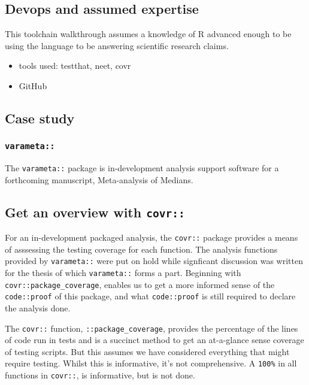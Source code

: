 \documentclass[
]{article}
\providecommand{\tightlist}{%
  \setlength{\itemsep}{0pt}\setlength{\parskip}{0pt}}
\begin{document}
\hypertarget{devops-and-assumed-expertise}{%
\subsection{Devops and assumed
expertise}\label{devops-and-assumed-expertise}}

This toolchain walkthrough assumes a knowledge of R advanced enough to
be using the language to be answering scientific research claims.

\begin{itemize}
\tightlist
\item
  tools used: testthat, neet, covr
\item
  GitHub
\end{itemize}

\hypertarget{case-study}{%
\subsection{Case study}\label{case-study}}

\hypertarget{varameta}{%
\subsubsection{\texorpdfstring{\texttt{varameta::}}{varameta::}}\label{varameta}}

The \texttt{varameta::} package is in-development analysis support
software for a forthcoming manuscript, Meta-analysis of Medians.

\hypertarget{get-an-overview-with-covr}{%
\subsection{\texorpdfstring{Get an overview with
\texttt{covr::}\label{sec: covr}}{Get an overview with covr::}}\label{get-an-overview-with-covr}}

For an in-development packaged analysis, the \texttt{covr::} package
provides a means of asssessing the testing coverage for each function.
The analysis functions provided by \texttt{varameta::} were put on hold
while signficant discussion was written for the thesis of which
\texttt{varameta::} forms a part. Beginning with
\texttt{covr::package\_coverage}, enables us to get a more informed
sense of the \texttt{code::proof} of this package, and what
\texttt{code::proof} is still required to declare the analysis done.

The \texttt{covr::} function, \texttt{::package\_coverage}, provides the
percentage of the lines of code run in tests and is a succinct method to
get an at-a-glance sense coverage of testing scripts. But this assumes
we have considered everything that might require testing. Whilst this is
informative, it's not comprehensive. A \texttt{100\%} in all functions
in \texttt{covr::}, is informative, but is not done.
\end{document}
